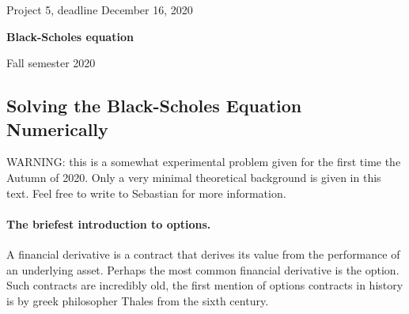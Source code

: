 \documentclass[%
oneside,                 %
final,                   %
10pt]{article}
\begin{document}

\newcommand{\exercisesection}[1]{\subsection*{#1}}






\thispagestyle{empty}

\begin{center}
{\LARGE\bf
\begin{spacing}{1.25}
Project 5, deadline  December 16, 2020
\end{spacing}
}
\end{center}


\begin{center}
{\bf Black-Scholes equation${}^{}$} \\ [0mm]
\end{center}

\begin{center}
\end{center}
    

\begin{center}
Fall semester 2020
\end{center}

\vspace{1cm}


\subsection{Solving the Black-Scholes Equation Numerically}

WARNING: this is a somewhat experimental problem given for the 
first time the Autumn of 2020. Only a very minimal theoretical 
background is given in this text. Feel free to write to Sebastian for more information.

\paragraph{The briefest introduction to options.}
A financial derivative is a contract that derives its value from 
the performance of an underlying asset. Perhaps the most common 
financial derivative is the option. Such contracts are 
incredibly old, the first mention of options contracts in 
history is by greek philosopher Thales from the sixth century.
\end{document}
